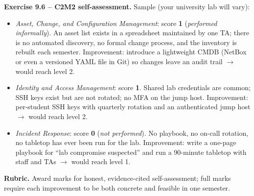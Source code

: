 \documentclass[11pt,a4paper]{article}
\begin{document}
\begin{solutionbox}
\textbf{Exercise 9.6 -- C2M2 self-assessment.}
Sample (your university lab will vary):
\begin{itemize}
  \item \emph{Asset, Change, and Configuration Management}: score \textbf{1} (\emph{performed informally}). An asset list exists in a spreadsheet maintained by one TA; there is no automated discovery, no formal change process, and the inventory is rebuilt each semester. Improvement: introduce a lightweight CMDB (NetBox or even a versioned YAML file in Git) so changes leave an audit trail $\to$ would reach level 2.
  \item \emph{Identity and Access Management}: score \textbf{1}. Shared lab credentials are common; SSH keys exist but are not rotated; no MFA on the jump host. Improvement: per-student SSH keys with quarterly rotation and an authenticated jump host $\to$ would reach level 2.
  \item \emph{Incident Response}: score \textbf{0} (\emph{not performed}). No playbook, no on-call rotation, no tabletop has ever been run for the lab. Improvement: write a one-page playbook for ``lab compromise suspected'' and run a 90-minute tabletop with staff and TAs $\to$ would reach level 1.
\end{itemize}
\textbf{Rubric.} Award marks for honest, evidence-cited self-assessment; full marks require each improvement to be both concrete and feasible in one semester.
\end{solutionbox}
\end{document}

